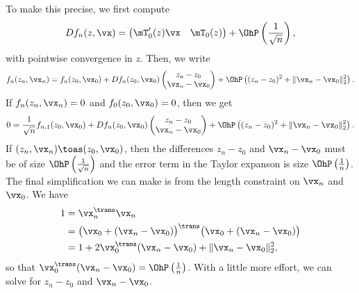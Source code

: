 To make this precise, we first compute
\begin{equation}
    D f_n(z, \vx)
    =
    \left(
    \begin{matrix}
        \mT_0'(z) \vx & \mT_0(z)
    \end{matrix}
    \right)
    +
    \OhP\left( \frac{1}{\sqrt{n}} \right),
\end{equation}
with pointwise convergence in $z$.  Then, we write
\[
    f_n( z_n, \vx_n)
        = 
        f_n (z_0, \vx_0)
        +
        D f_n( z_0, \vx_0 )
        \left(
        \begin{matrix}
            z_n - z_0 \\
            \vx_n - \vx_0
        \end{matrix}
        \right)
        +
        \OhP \left(
            (z_n - z_0)^2
            +
            \| \vx_n - \vx_0 \|_2^2
        \right).
\]
If $f_n(z_n, \vx_n) = 0$ and $f_0(z_0, \vx_0) = 0$, then we get
\[
    0
    =
    \frac{1}{\sqrt{n}} f_{n,1} (z_0, \vx_0)
        +
        D f_n( z_0, \vx_0 )
        \left(
        \begin{matrix}
            z_n - z_0 \\
            \vx_n - \vx_0
        \end{matrix}
        \right)
        +
        \OhP \left(
            (z_n - z_0)^2
            +
            \| \vx_n - \vx_0 \|_2^2
        \right).
\]
If $(z_n, \vx_n) \toas (z_0, \vx_0)$, then 
the differences $z_n - z_0$ and $\vx_n - \vx_0$ must be of size
$\OhP\left( \frac{1}{\sqrt{n}} \right)$ and the error term in the Taylor
expanson is size $\OhP\left( \frac{1}{n} \right)$.  The final simplification
we can make is from the length constraint on $\vx_n$ and $\vx_0$.  We have
\begin{align*}
    1 &= \vx_n^\trans \vx_n \\
      &= \big( \vx_0 + (\vx_n - \vx_0) \big)^\trans
         \big( \vx_0 + (\vx_n - \vx_0) \big) \\
      &= 1 + 2 \vx_0^\trans ( \vx_n - \vx_0 ) + \| \vx_n - \vx_0 \|_2^2,
\end{align*}
so that $\vx_0^\trans ( \vx_n - \vx_0 ) = \OhP\left( \frac{1}{n} \right)$.  With a little more effort, we can solve for $z_n - z_0$ and $\vx_n - \vx_0$.


